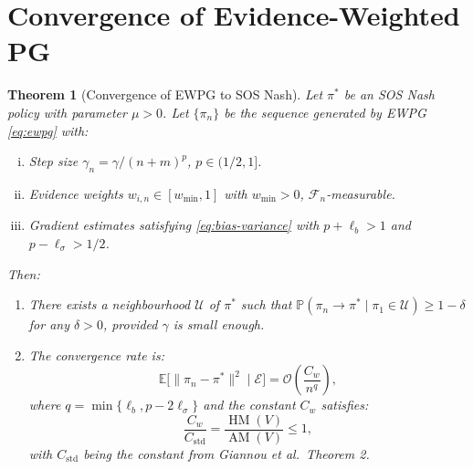 \documentclass[11pt,a4paper]{article}
\newtheorem{theorem}{Theorem}[section]
\DeclareMathOperator{\AM}{AM}
\DeclareMathOperator{\HM}{HM}
\newcommand{\E}{\mathbb{E}}
\newcommand{\Prob}{\mathbb{P}}
\newcommand{\cF}{\mathcal{F}}
\newcommand{\cU}{\mathcal{U}}
\newcommand{\cE}{\mathcal{E}}
\begin{document}
\section{Convergence of Evidence-Weighted PG}
\label{sec:convergence}

\begin{theorem}[Convergence of EWPG to SOS Nash]
\label{thm:ewpg-convergence}
Let $\pi^*$ be an SOS Nash policy with parameter $\mu > 0$. Let $\{\pi_n\}$ be the sequence generated by EWPG \eqref{eq:ewpg} with:
\begin{enumerate}[(i)]
    \item Step size $\gamma_n = \gamma/(n+m)^p$, $p \in (1/2, 1]$.
    \item Evidence weights $w_{i,n} \in [w_{\min}, 1]$ with $w_{\min} > 0$, $\cF_n$-measurable.
    \item Gradient estimates satisfying \eqref{eq:bias-variance} with $p + \ell_b > 1$ and $p - \ell_\sigma > 1/2$.
\end{enumerate}
Then:
\begin{enumerate}[(1)]
    \item There exists a neighbourhood $\cU$ of $\pi^*$ such that $\Prob(\pi_n \to \pi^* \mid \pi_1 \in \cU) \geq 1 - \delta$ for any $\delta > 0$, provided $\gamma$ is small enough.

    \item The convergence rate is:
    \begin{equation}
    \label{eq:ewpg-rate}
        \E\bigl[\|\pi_n - \pi^*\|^2 \mid \cE\bigr] = \mathcal{O}\!\left(\frac{C_w}{n^q}\right),
    \end{equation}
    where $q = \min\{\ell_b, p - 2\ell_\sigma\}$ and the constant $C_w$ satisfies:
    \begin{equation}
    \label{eq:constant-improvement}
        \frac{C_w}{C_{\mathrm{std}}} = \frac{\HM(V)}{\AM(V)} \leq 1,
    \end{equation}
    with $C_{\mathrm{std}}$ being the constant from Giannou et al.\ Theorem 2.
\end{enumerate}
\end{theorem}
\end{document}
